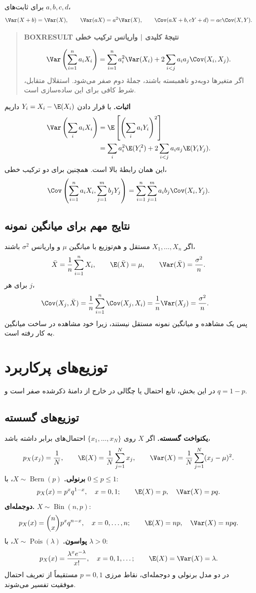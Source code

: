 برای ثابت‌های $a,b,c,d$،
\[
\Var(X+b)=\Var(X),\qquad \Var(aX)=a^2\Var(X),
\qquad \Cov(aX+b,cY+d)=ac\Cov(X,Y).
\]
\begin{quote}\textbf{BOXRESULT نتیجهٔ کلیدی | واریانس ترکیب خطی}\par 
\[
\Var\left(\sum_{i=1}^na_iX_i\right)
=\sum_{i=1}^na_i^2\Var(X_i)
+2\sum_{i<j}a_ia_j\Cov(X_i,X_j).
\]
اگر متغیرها دوبه‌دو ناهمبسته باشند، جملهٔ دوم صفر می‌شود. استقلال متقابل، شرط کافی برای این ساده‌سازی است.
\end{quote}
\textbf{اثبات.} با قرار دادن $Y_i=X_i-\E(X_i)$ داریم
\begin{align*}
\Var\left(\sum_i a_iX_i\right)
&=\E\left[\left(\sum_i a_iY_i\right)^2\right]\\
&=\sum_i a_i^2\E(Y_i^2)+2\sum_{i<j}a_ia_j\E(Y_iY_j).
\end{align*}
این همان رابطهٔ بالا است. همچنین برای دو ترکیب خطی،
\[
\Cov\left(\sum_{i=1}^n a_iX_i,\sum_{j=1}^m b_jY_j\right)
=\sum_{i=1}^n\sum_{j=1}^m a_ib_j\Cov(X_i,Y_j).
\]
\subsection{نتایج مهم برای میانگین نمونه}
اگر $X_1,\ldots,X_n$ مستقل و هم‌توزیع با میانگین $\mu$ و واریانس $\sigma^2$ باشند،
\[
\bar X=\frac1n\sum_{i=1}^nX_i,\qquad
\E(\bar X)=\mu,\qquad \Var(\bar X)=\frac{\sigma^2}{n}.
\]
برای هر $j$،
\begin{align*}
\Cov(X_j,\bar X)
&=\frac1n\sum_{i=1}^n\Cov(X_j,X_i)
=\frac1n\Var(X_j)=\frac{\sigma^2}{n}.
\end{align*}
پس یک مشاهده و میانگین نمونه مستقل نیستند، زیرا خود مشاهده در ساخت میانگین به کار رفته است.
\section{توزیع‌های پرکاربرد}
در این بخش، تابع احتمال یا چگالی در خارج از دامنهٔ ذکرشده صفر است و $q=1-p$.
\subsection{توزیع‌های گسسته}
\textbf{یکنواخت گسسته.} اگر $X$ روی $\{x_1,\ldots,x_N\}$ احتمال‌های برابر داشته باشد،
\[
p_X(x_j)=\frac1N,\qquad
\E(X)=\frac1N\sum_{j=1}^N x_j,\qquad
\Var(X)=\frac1N\sum_{j=1}^N(x_j-\mu)^2.
\]
\textbf{برنولی.} $X\sim\operatorname{Bern}(p)$، با $0\le p\le1$:
\[
p_X(x)=p^xq^{1-x},\quad x=0,1;\qquad
\E(X)=p,\quad\Var(X)=pq.
\]
\textbf{دوجمله‌ای.} $X\sim\operatorname{Bin}(n,p)$:
\[
p_X(x)=\binom nx p^xq^{n-x},\quad x=0,\ldots,n;\qquad
\E(X)=np,\quad\Var(X)=npq.
\]
\textbf{پواسون.} $X\sim\operatorname{Pois}(\lambda)$، با $\lambda>0$:
\[
p_X(x)=\frac{\lambda^x e^{-\lambda}}{x!},\quad x=0,1,\ldots;
\qquad\E(X)=\Var(X)=\lambda.
\]
در دو مدل برنولی و دوجمله‌ای، نقاط مرزی $p=0,1$ مستقیماً از تعریف احتمال موفقیت تفسیر می‌شوند.
